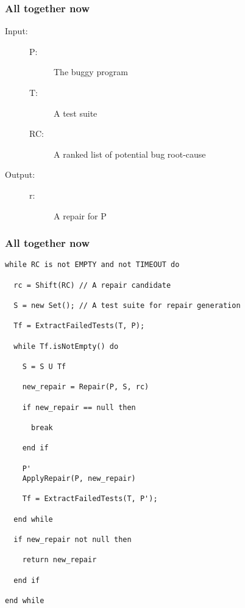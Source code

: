\documentclass{beamer}
\begin{document}
  \frame
  {
    \frametitle{All together now}
    \begin{description}
     \item[Input:] 
    \begin{description}
     \item[P:] The buggy program

     \item[T:] A test suite

     \item[RC:] A ranked list of potential bug root-cause
    \end{description}
    \item[Output:]
    \begin{description}
     \item[r:] A repair for P

    \end{description}
     \end{description}


  }
  
  
  \begin{frame}[fragile]
    \frametitle{All together now}
    \begin{lstlisting}
while RC is not EMPTY and not TIMEOUT do

  rc = Shift(RC) // A repair candidate

  S = new Set(); // A test suite for repair generation

  Tf = ExtractFailedTests(T, P);

  while Tf.isNotEmpty() do

    S = S U Tf

    new_repair = Repair(P, S, rc)

    if new_repair == null then

      break

    end if

    P'
    ApplyRepair(P, new_repair)

    Tf = ExtractFailedTests(T, P');

  end while

  if new_repair not null then

    return new_repair

  end if

end while

\end{lstlisting}
\end{frame}
\end{document}
